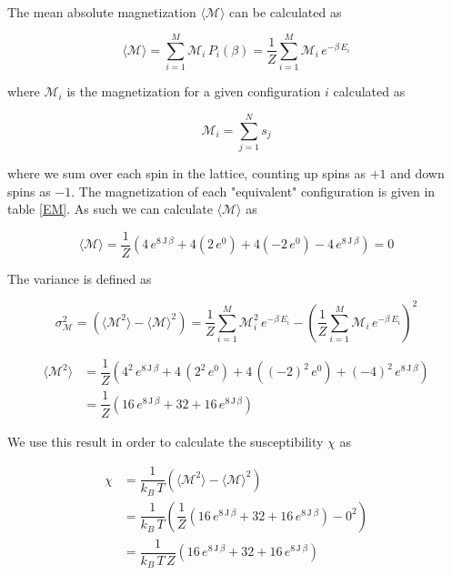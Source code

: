 \documentclass[a4paper, fontsize=11pt]{article}
\begin{document}
\paragraph{}
The mean absolute magnetization $\langle \mathcal{M} \rangle$ can be calculated as

\begin{equation}
\langle \mathcal{M} \rangle = \sum^M_{i=1} \mathcal{M}_{i} \, P_{i}(\beta) = \dfrac{1}{Z} \sum^M_{i=1} \mathcal{M}_{i} \, e^{-\beta \, E_{i}}
\end{equation}

where $\mathcal{M}_{i}$ is the magnetization for a given configuration $i$ calculated as

\begin{equation}
\mathcal{M}_{i} = \sum^N_{j=1} s_{j}
\end{equation}

where we sum over each spin in the lattice, counting up spins as $+1$ and down spins as $-1$. The magnetization of each "equivalent" configuration is given in table \ref{EM}. As such we can calculate $\langle \mathcal{M} \rangle$ as

\begin{equation}
\langle \mathcal{M} \rangle = \dfrac{1}{Z} \left( 4 \, e^{8 \, \text{J} \, \beta} + 4 (2 \, e^0) + 4 ( -2 \, e^0) -4 \, e^{8 \, \text{J} \, \beta} \right) = 0
\end{equation}

The variance is defined as 

\begin{equation}
\sigma^2_{\mathcal{M}} = \left( \langle \mathcal{M}^2 \rangle - \langle \mathcal{M} \rangle^2 \right) = \dfrac{1}{Z} \sum^M_{i=1} \mathcal{M}_{i}^2 \, e^{-\beta \, E_{i}} - \left( \dfrac{1}{Z} \sum^M_{i=1} \mathcal{M}_{i} \, e^{-\beta \, E_{i}} \right)^2
\end{equation}

\begin{align}
\langle \mathcal{M}^2 \rangle &= \dfrac{1}{Z} \left( 4^2 \, e^{8 \, \text{J} \, \beta} + 4 \, (2^2 \, e^0 ) + 4 \, ((-2)^2 \, e^0) + (-4)^2 \, e^{8 \, \text{J} \, \beta} \right) 
\\
&=\dfrac{1}{Z} \left( 16 \, e^{8 \, \text{J} \, \beta} + 32 + 16 \, e^{8 \, \text{J} \, \beta} \right) 
\end{align}

We use this result in order to calculate the susceptibility $\chi$ as

\begin{align}
\chi &= \dfrac{1}{k_{B} \, T} \left( \langle \mathcal{M}^2 \rangle - \langle \mathcal{M} \rangle^2 \right)
\\
&=\dfrac{1}{k_{B} \, T} \left( \dfrac{1}{Z} \left( 16 \, e^{8 \, \text{J} \, \beta} + 32 + 16 \, e^{8 \, \text{J} \, \beta} \right)  - 0^2 \right)
\\
&= 
\dfrac{1}{k_{B} \, T \, Z} \left( 16 \, e^{8 \, \text{J} \, \beta} + 32 + 16 \, e^{8 \, \text{J} \, \beta} \right) 
\end{align}
\end{document}
